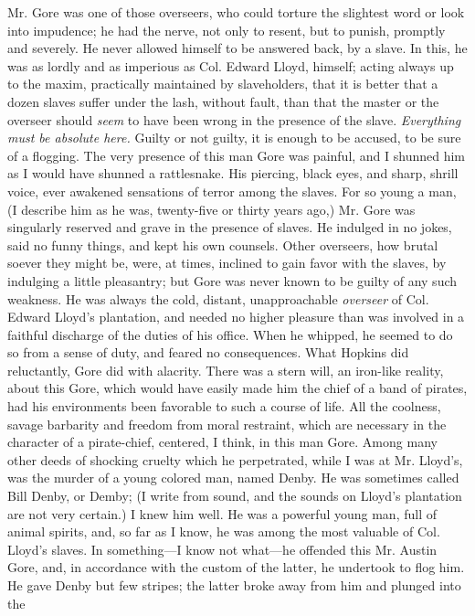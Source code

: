 Mr. Gore was one of those overseers, who could {}torture the slightest
word or look into impudence; he had the nerve, not only to resent, but
to punish, promptly and severely. He never allowed himself to be
answered back, by a slave. In this, he was as lordly and as imperious as
Col. Edward Lloyd, himself; acting always up to the maxim, practically
maintained by slaveholders, that it is better that a dozen slaves suffer
under the lash, without fault, than that the master or the overseer
should \emph{seem} to have been wrong in the presence of the slave.
\emph{Everything must be absolute here.} Guilty or not guilty, it is
enough to be accused, to be sure of a flogging. The very presence of
this man Gore was painful, and I shunned him as I would have shunned a
rattlesnake. His piercing, black eyes, and sharp, shrill voice, ever
awakened sensations of terror among the slaves. For so young a man, (I
describe him as he was, twenty-five or thirty years ago,) Mr. Gore was
singularly reserved and grave in the presence of slaves. He indulged in
no jokes, said no funny things, and kept his own counsels. Other
overseers, how brutal soever they might be, were, at times, inclined to
gain favor with the slaves, by indulging a little pleasantry; but Gore
was never known to be guilty of any such weakness. He was always the
cold, distant, unapproachable \emph{overseer} of Col. Edward Lloyd's
plantation, and needed no higher pleasure than was involved in a
faithful discharge of the duties of his office. When he whipped, he
seemed to do so from a sense of duty, and feared no consequences. What
Hopkins did reluctantly, Gore did with alacrity. There was a stern will,
an iron-like reality, about this Gore, which {}would have easily made
him the chief of a band of pirates, had his environments been favorable
to such a course of life. All the coolness, savage barbarity and freedom
from moral restraint, which are necessary in the character of a
pirate-chief, centered, I think, in this man Gore. Among many other
deeds of shocking cruelty which he perpetrated, while I was at Mr.
Lloyd's, was the murder of a young colored man, named Denby. He was
sometimes called Bill Denby, or Demby; (I write from sound, and the
sounds on Lloyd's plantation are not very certain.) I knew him well. He
was a powerful young man, full of animal spirits, and, so far as I know,
he was among the most valuable of Col. Lloyd's slaves. In something---I
know not what---he offended this Mr. Austin Gore, and, in accordance
with the custom of the latter, he undertook to flog him. He gave Denby
but few stripes; the latter broke away from him and plunged into the
